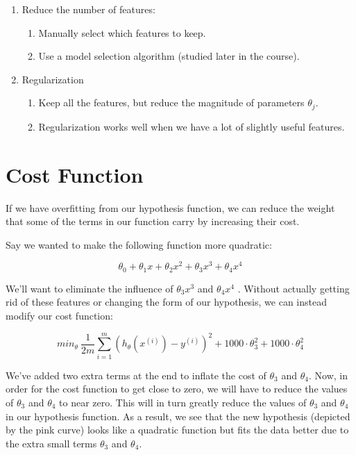 \documentclass[10pt,a4paper,UTF8]{article}
\begin{document}
\begin{enumerate}
\item Reduce the number of features:
\begin{enumerate}
\item Manually select which features to keep.
\item Use a model selection algorithm (studied later in the course).
\end{enumerate}
\item Regularization
\begin{enumerate}
\item Keep all the features, but reduce the magnitude of parameters \(\theta_{j}\).
\item Regularization works well when we have a lot of slightly useful features.
\end{enumerate}
\end{enumerate}

\section{Cost Function}
\label{sec:org2973170}


If we have overfitting from our hypothesis function, we can reduce the weight that some of the terms in our function carry by increasing their cost.

Say we wanted to make the following function more quadratic:

\begin{equation}
\label{eq:4}
\theta_0 + \theta_1x + \theta_2x^2 + \theta_3x^3 + \theta_4x^4
\end{equation}

We'll want to eliminate the influence of \(\theta_{3}x^{3}\) and \(\theta_{4}x^{4}\) . Without actually getting rid of these features or changing the form of our hypothesis, we can instead modify our cost function:

\begin{equation}
\label{eq:5}
min_\theta\ \dfrac{1}{2m}\sum_{i=1}^m (h_\theta(x^{(i)}) - y^{(i)})^2 + 1000\cdot\theta_3^2 + 1000\cdot\theta_4^2
\end{equation}

We've added two extra terms at the end to inflate the cost of \(\theta_{3}\) and \(\theta_{4}\). Now, in order for the cost function to get close to zero, we will have to reduce the values of \(\theta_{3}\) and \(\theta_{4}\) to near zero. This will in turn greatly reduce the values of \(\theta_{3}\) and \(\theta_{4}\) in our hypothesis function. As a result, we see that the new hypothesis (depicted by the pink curve) looks like a quadratic function but fits the data better due to the extra small terms \(\theta_{3}\) and \(\theta_{4}\).
\end{document}
